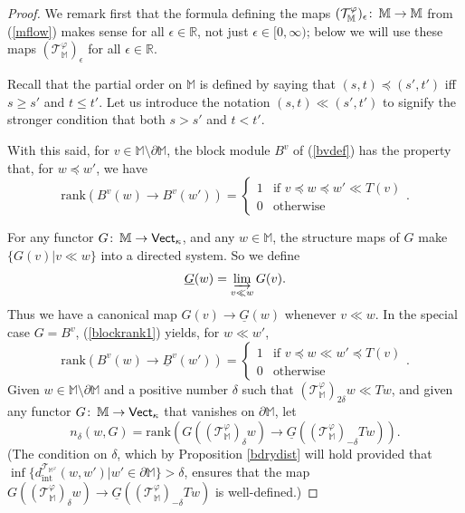 \documentclass[11pt]{amsart}
\theoremstyle{definition}
\theoremstyle{remark}
\numberwithin{equation}{section}
\def\co{\colon\thinspace}
\def\ep{\epsilon}
\def\R{\mathbb{R}}
\begin{document}
\begin{proof}
We remark first that the formula defining the maps $(\mathcal{T}_{\mathbb{M}}^{\varphi})_{\ep}\co \mathbb{M}\to\mathbb{M}$ from (\ref{mflow}) makes sense for all $\ep\in \mathbb{R}$, not just $\ep\in [0,\infty)$; below we will use these maps $(\mathcal{T}_{\mathbb{M}}^{\varphi})_{\ep}$ for all $\ep\in\R$.

Recall that the partial order on $\mathbb{M}$ is defined by saying that $(s,t)\preceq (s',t')$ iff $s\geq s'$ and $t\leq t'$.  Let us introduce the notation $(s,t)\ll (s',t')$ to signify the stronger condition that both $s>s'$ and $t<t'$.

With this said, for $v\in \mathbb{M}\setminus\partial\mathbb{M}$, the block module $B^v$ of (\ref{bvdef})  has the property that, for $w\preceq w'$, we have \begin{equation} \mathrm{rank}(B^v(w)\to B^v(w'))=\left\{\begin{array}{ll} 1 & \mbox{if }v\preceq w\preceq w'\ll T(v)\\ 0 & \mbox{otherwise}\end{array}\right..\label{blockrank1}\end{equation}

For any functor $G\co \mathbb{M}\to \mathsf{Vect}_{\kappa}$, and any $w\in \mathbb{M}$, the structure maps of $G$ make $\{G(v)|v\ll w\}$ into a directed system.  So we define \[ \underline{G}(w)=\varinjlim_{v\ll w}G(v).\]  Thus we have a canonical map $G(v)\to \underline{G}(w)$ whenever $v\ll w$.  In the special case $G=B^v$, (\ref{blockrank1}) yields, for $w\ll w'$,  
\begin{equation} \mathrm{rank}(B^v(w)\to \underline{B}^v(w'))=\left\{\begin{array}{ll} 1 & \mbox{if }v\preceq w\ll w'\preceq T(v)\\ 0 & \mbox{otherwise}\end{array}\right..\label{blockrank2}\end{equation}
Given  $w\in \mathbb{M}\setminus\partial\mathbb{M}$ and a positive number $\delta$ such that $(\mathcal{T}_{\mathbb{M}}^{\varphi})_{2\delta}w\ll Tw$, and given any functor $G\co \mathbb{M}\to\mathsf{Vect}_{\kappa}$ that vanishes on $\partial\mathbb{M}$, let \[ n_{\delta}(w,G)=\mathrm{rank}\left(G\left((\mathcal{T}^{\varphi}_{\mathbb{M}})_{\delta}w\right)\to \underline{G}\left((\mathcal{T}^{\varphi}_{\mathbb{M}})_{-\delta}Tw \right)\right).\]  (The condition on $\delta$, which by Proposition \ref{bdrydist} will hold provided that $\inf\{d_{\mathrm{int}}^{\mathcal{T}_{\mathbb{M}^{\varphi}}}(w,w')|w'\in\partial\mathbb{M}\}>\delta$, ensures that the map $G\left((\mathcal{T}^{\varphi}_{\mathbb{M}})_{\delta}w\right)\to \underline{G}\left((\mathcal{T}^{\varphi}_{\mathbb{M}})_{-\delta}Tw\right)$ is well-defined.) %
	

\end{proof}
\end{document}
